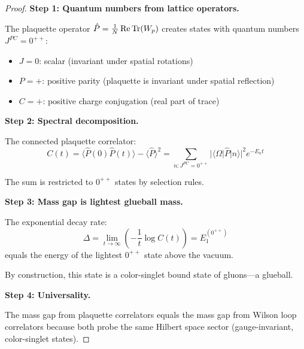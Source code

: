 \begin{proof}
\textbf{Step 1: Quantum numbers from lattice operators.}

The plaquette operator $\hat{P} = \frac{1}{N}\operatorname{Re}\operatorname{Tr}(W_p)$ creates states with 
quantum numbers $J^{PC} = 0^{++}$:
\begin{itemize}
\item $J = 0$: scalar (invariant under spatial rotations)
\item $P = +$: positive parity (plaquette is invariant under spatial reflection)
\item $C = +$: positive charge conjugation (real part of trace)
\end{itemize}

\textbf{Step 2: Spectral decomposition.}

The connected plaquette correlator:
\[
C(t) = \langle \hat{P}(0) \hat{P}(t) \rangle - \langle \hat{P} \rangle^2 
= \sum_{n : J^{PC} = 0^{++}} |\langle \Omega | \hat{P} | n \rangle|^2 e^{-E_n t}
\]

The sum is restricted to $0^{++}$ states by selection rules.

\textbf{Step 3: Mass gap is lightest glueball mass.}

The exponential decay rate:
\[
\Delta = \lim_{t \to \infty} \left(-\frac{1}{t} \log C(t)\right) = E_1^{(0^{++})}
\]
equals the energy of the lightest $0^{++}$ state above the vacuum.

By construction, this state is a color-singlet bound state of gluons---a glueball.

\textbf{Step 4: Universality.}

The mass gap from plaquette correlators equals the mass gap from Wilson loop 
correlators because both probe the same Hilbert space sector (gauge-invariant, 
color-singlet states).
\end{proof}

